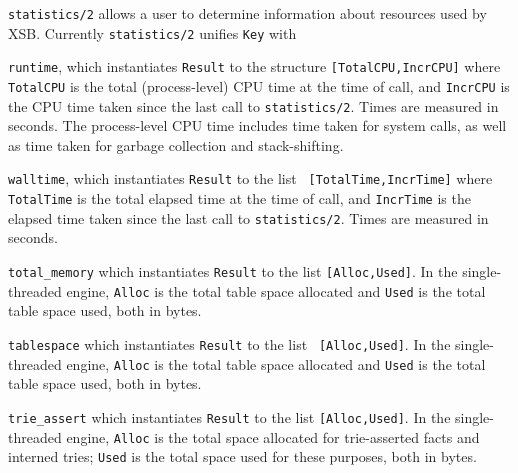 \begin{description}
%
{\tt statistics/2} allows a user to determine information about
resources used by XSB.  Currently {\tt statistics/2} unifies {\tt Key}
with
\bi
\item {\tt runtime}, which instantiates {\tt Result} to the structure
  {\tt [TotalCPU,IncrCPU]} where {\tt TotalCPU} is the total
  (process-level) CPU time at the time of call, and {\tt IncrCPU} is
  the CPU time taken since the last call to {\tt statistics/2}.  Times
  are measured in seconds.  The process-level CPU time includes time
  taken for system calls, as well as time taken for garbage collection
  and stack-shifting.  %
%
\item {\tt walltime}, which instantiates {\tt Result} to the list {\tt
 [TotalTime,IncrTime]} where {\tt TotalTime} is the total elapsed time
 at the time of call, and {\tt IncrTime} is the elapsed time taken
 since the last call to {\tt statistics/2}.  Times are measured in
 seconds.
%
\item {\tt total\_memory} which instantiates {\tt Result} to the list
 {\tt [Alloc,Used]}.  In the single-threaded engine, {\tt Alloc} is
 the total table space allocated and {\tt Used} is the total table
 space used, both in bytes.
%
\item {\tt tablespace} which instantiates {\tt Result} to the list {\tt
 [Alloc,Used]}.  In the single-threaded engine, {\tt Alloc} is the
 total table space allocated and {\tt Used} is the total table space
 used, both in bytes.
%
%
\item {\tt trie\_assert} which instantiates {\tt Result} to the list
 {\tt [Alloc,Used]}.  In the single-threaded engine, {\tt Alloc} is
 the total space allocated for trie-asserted facts and interned tries;
 {\tt Used} is the total space used for these purposes, both in bytes.
%

\end{description}
